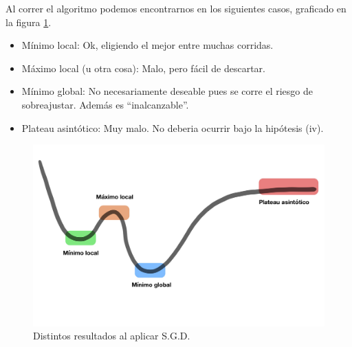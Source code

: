 \begin{remark}
Al correr el algoritmo podemos encontrarnos en los siguientes casos, graficado en la figura \ref{fig:sgd}.
\begin{itemize}
    \item Mínimo local: Ok, eligiendo el mejor entre muchas corridas.
    \item Máximo local (u otra cosa): Malo, pero fácil de descartar.
    \item Mínimo global: No necesariamente deseable pues se corre el riesgo de sobreajustar. Además es ``inalcanzable''.
    \item Plateau asintótico: Muy malo. No deberia ocurrir bajo la hipótesis (iv).
\end{itemize}
\end{remark}
\begin{figure}
    \centering
    \includegraphics[scale=0.16]{img/Clase_18_pag_09.jpg}
    \caption{Distintos resultados al aplicar S.G.D.}
    \label{fig:sgd}
\end{figure}
